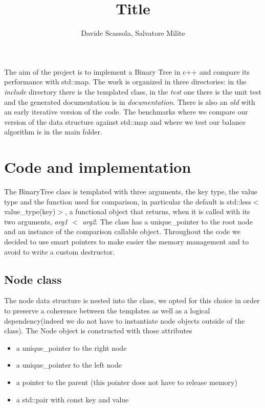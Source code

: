 \documentclass[a4paper,11pt]{article}
\title{Title}
\author{Davide Scassola, Salvatore Milite}
\begin{document}
\maketitle

The aim of the project is to implement a Binary Tree in c++ and compare its performance with std::map. The work is organized in three directories: in the \emph{include} directory there is the templated class, in the \emph{test} one there is the unit test and the generated documentation is in \emph{documentation}. There is also an \emph{old} with an early iterative version of the code. The benchmarks where we compare our version of the data structure against std::map and where we test our balance algorithm is in the main folder.  


\section*{Code and implementation}

The BinaryTree class is templated with three arguments, the key type, the value type and the function used for comparison, in particular the default is std::less$<$value\_type(key)$>$, a functional object that returns, when it is called with its two arguments, \emph{arg1 $<$ arg2}. The class has a unique\_pointer to the root node and an instance of the comparison callable object. Throughout the code we decided to use smart pointers to make easier the memory management and to avoid to write a custom destructor.  

\subsection*{Node class}

The node data structure is nested into the class, we opted for this choice in order to preserve a coherence between the templates as well as a logical dependency(indeed we do not have to instantiate node objects outside of the class). The Node object is constructed with those attributes 

\begin{itemize}
\item a unique\_pointer to the right node

\item a unique\_pointer to the left node

\item a pointer to the parent (this pointer does not have to release memory)

\item a std::pair with const key and value
\end{itemize}
\end{document}
